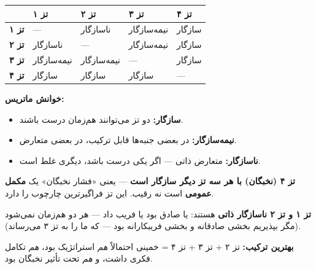 \documentclass[12pt,a4paper]{book}
\newcommand{\keyword}[1]{\textbf{\textcolor{cPrimary}{#1}}}
\begin{document}
\begin{principleBox}
\begin{longtable}{%
    >{\centering\arraybackslash}p{}
    >{\centering\arraybackslash}p{}
    >{\centering\arraybackslash}p{}
    >{\centering\arraybackslash}p{}
    >{\centering\arraybackslash}p{}}
\toprule
\rowcolor{cPrimary!10}
& \cellcolor{cGreen!15}\textbf{تز ۱} & \cellcolor{cAccent!10}\textbf{تز ۲} & \cellcolor{cGold!15}\textbf{تز ۳} & \cellcolor{cConsolid!10}\textbf{تز ۴} \\
\midrule

\cellcolor{cGreen!15}\textbf{تز ۱} & — & \textcolor{cAccent}{ناسازگار} & \textcolor{cGold}{نیمه‌سازگار} & \textcolor{cGreen}{سازگار} \\
\midrule
\cellcolor{cAccent!10}\textbf{تز ۲} & \textcolor{cAccent}{ناسازگار} & — & \textcolor{cGold}{نیمه‌سازگار} & \textcolor{cGreen}{سازگار} \\
\midrule
\cellcolor{cGold!15}\textbf{تز ۳} & \textcolor{cGold}{نیمه‌سازگار} & \textcolor{cGold}{نیمه‌سازگار} & — & \textcolor{cGreen}{سازگار} \\
\midrule
\cellcolor{cConsolid!10}\textbf{تز ۴} & \textcolor{cGreen}{سازگار} & \textcolor{cGreen}{سازگار} & \textcolor{cGreen}{سازگار} & — \\

\bottomrule
\end{longtable}

\textbf{خوانش ماتریس:}
\begin{itemize}[label=\textcolor{cPrimary}{$\bullet$}, rightmargin=2em]
    \item \textcolor{cGreen}{\textbf{سازگار:}} دو تز می‌توانند هم‌زمان درست باشند.
    \item \textcolor{cGold}{\textbf{نیمه‌سازگار:}} در بعضی جنبه‌ها قابل ترکیب، در بعضی متعارض.
    \item \textcolor{cAccent}{\textbf{ناسازگار:}} متعارض ذاتی — اگر یکی درست باشد، دیگری غلط است.
\end{itemize}
\end{principleBox}

\begin{noteBox}
\keyword{تز ۴ (نخبگان) با هر سه تز دیگر سازگار است} — یعنی «فشار نخبگان» یک \keyword{مکمل عمومی} است نه رقیب. این تز فراگیرترین چارچوب را دارد.

\keyword{تز ۱ و تز ۲ ناسازگار ذاتی} هستند: یا صادق بود یا فریب داد — هر دو هم‌زمان نمی‌شود (مگر بپذیریم بخشی صادقانه و بخشی فریبکارانه بود — که ما را به تز ۳ می‌رساند).

\keyword{بهترین ترکیب:} تز ۲ + تز ۳ + تز ۴ = خمینی احتمالاً \textit{هم} استراتژیک بود، \textit{هم} تکامل فکری داشت، و \textit{هم} تحت تأثیر نخبگان بود.
\end{noteBox}
\end{document}
